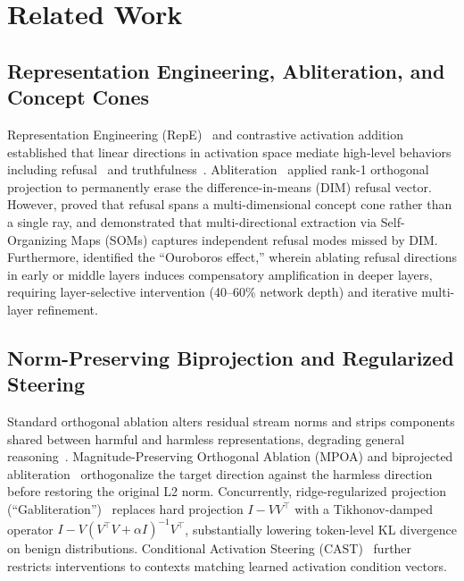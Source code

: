 \documentclass{article}
\begin{document}
\section{Related Work}

\subsection{Representation Engineering, Abliteration, and Concept Cones}
Representation Engineering (RepE)~\cite{turner2024steering, panickssery2024steering} and contrastive activation addition established that linear directions in activation space mediate high-level behaviors including refusal~\cite{arditi2024refusal} and truthfulness~\cite{marks2024standard}. Abliteration~\cite{llmswithoutlimits2024} applied rank-1 orthogonal projection to permanently erase the difference-in-means (DIM) refusal vector. However, \cite{wollschlager2025geometry} proved that refusal spans a multi-dimensional concept cone rather than a single ray, and \cite{piras2026som} demonstrated that multi-directional extraction via Self-Organizing Maps (SOMs) captures independent refusal modes missed by DIM. Furthermore, \cite{nanfack2026optimal} identified the ``Ouroboros effect,'' wherein ablating refusal directions in early or middle layers induces compensatory amplification in deeper layers, requiring layer-selective intervention (40--60\% network depth) and iterative multi-layer refinement.

\subsection{Norm-Preserving Biprojection and Regularized Steering}
Standard orthogonal ablation alters residual stream norms and strips components shared between harmful and harmless representations, degrading general reasoning~\cite{braun2024sober}. Magnitude-Preserving Orthogonal Ablation (MPOA) and biprojected abliteration~\cite{lai2025mpoa} orthogonalize the target direction against the harmless direction before restoring the original L2 norm. Concurrently, ridge-regularized projection (``Gabliteration'')~\cite{gabliteration2025} replaces hard projection $I - VV^\top$ with a Tikhonov-damped operator $I - V(V^\top V + \alpha I)^{-1}V^\top$, substantially lowering token-level KL divergence on benign distributions. Conditional Activation Steering (CAST)~\cite{lee2025cast} further restricts interventions to contexts matching learned activation condition vectors.
\end{document}
